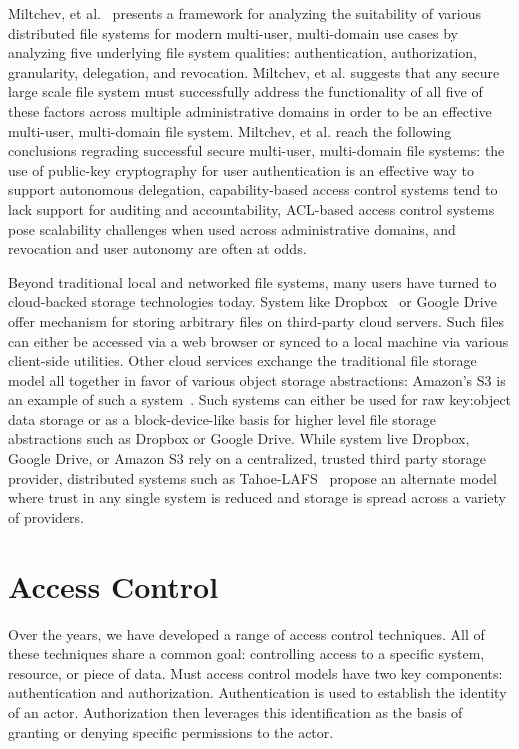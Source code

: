 Miltchev, et al.~\cite{Miltchev2008} presents a framework for
analyzing the suitability of various distributed file systems for
modern multi-user, multi-domain use cases by analyzing five underlying
file system qualities: authentication, authorization, granularity,
delegation, and revocation. Miltchev, et al. suggests that any secure
large scale file system must successfully address the functionality of
all five of these factors across multiple administrative domains in
order to be an effective multi-user, multi-domain file
system. Miltchev, et al. reach the following conclusions regrading
successful secure multi-user, multi-domain file systems: the use of
public-key cryptography for user authentication is an effective way to
support autonomous delegation, capability-based access control systems
tend to lack support for auditing and accountability, ACL-based access
control systems pose scalability challenges when used across
administrative domains, and revocation and user autonomy are often at
odds.

Beyond traditional local and networked file systems, many users have
turned to cloud-backed storage technologies today. System like
Dropbox~\cite{dropbox} or Google Drive~\cite{google-drive} offer
mechanism for storing arbitrary files on third-party cloud
servers. Such files can either be accessed via a web browser or synced
to a local machine via various client-side utilities. Other cloud
services exchange the traditional file storage model all together in
favor of various object storage abstractions: Amazon's S3 is an
example of such a system~\cite{amazon-s3}. Such systems can either be
used for raw key:object data storage or as a block-device-like basis
for higher level file storage abstractions such as Dropbox or Google
Drive. While system live Dropbox, Google Drive, or Amazon S3 rely on a
centralized, trusted third party storage provider, distributed systems
such as Tahoe-LAFS~\cite{wilcox-o'hearn2008} propose an alternate
model where trust in any single system is reduced and storage is
spread across a variety of providers.

\section{Access Control}
\label{chap:background:ac}

Over the years, we have developed a range of access control
techniques. All of these techniques share a common goal: controlling
access to a specific system, resource, or piece of data. Must access
control models have two key components: authentication and
authorization.  Authentication is used to establish the identity of an
actor. Authorization then leverages this identification as the basis
of granting or denying specific permissions to the actor.

